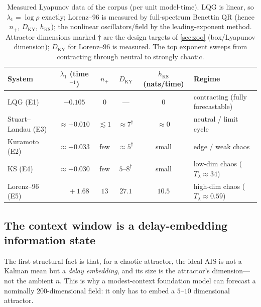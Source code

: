 \documentclass[10pt]{article}
\theoremstyle{plain}
\theoremstyle{definition}
\theoremstyle{remark}
\newcommand{\hKS}{h_{\mathrm{KS}}}
\newcommand{\DKY}{D_{\mathrm{KY}}}
\begin{document}
\begin{table}[t]
\centering\small
\setlength{\tabcolsep}{6pt}\renewcommand{\arraystretch}{1.2}
\caption{Measured Lyapunov data of the corpus (per unit model-time). LQG is
linear, so $\lambda_1=\log\rho$ exactly; Lorenz--96 is measured by full-spectrum
Benettin QR (hence $n_+$, $\DKY$, $\hKS$); the nonlinear oscillators/field by the
leading-exponent method. Attractor dimensions marked $\dagger$ are the design
targets of \cref{sec:zoo} (box/Lyapunov dimension); $D_{\mathrm{KY}}$ for
Lorenz--96 is measured. The top exponent sweeps from contracting through neutral
to strongly chaotic.}
\label{tab:master}
\begin{tabular}{@{}lccccl@{}}
\toprule
System & $\lambda_1$ (time$^{-1}$) & $n_+$ & $\DKY$ & $\hKS$ (nats/time) & Regime\\
\midrule
LQG (E1) & $-0.105$ & $0$ & --- & $0$ & contracting (fully forecastable)\\
Stuart--Landau (E3) & $\approx +0.010$ & $\lesssim1$ & $\approx7^{\dagger}$ & $\approx0$ & neutral / limit cycle\\
Kuramoto (E2) & $\approx +0.033$ & few & $\approx5^{\dagger}$ & small & edge / weak chaos\\
KS (E4) & $\approx +0.030$ & few & $5\text{--}8^{\dagger}$ & small & low-dim chaos ($T_\lambda\!\approx\!34$)\\
Lorenz--96 (E5) & $\phantom{+}{+}1.68$ & $13$ & $27.1$ & $10.5$ & high-dim chaos ($T_\lambda\!\approx\!0.59$)\\
\bottomrule
\end{tabular}
\end{table}

\subsection{The context window is a delay-embedding information state}
The first structural fact is that, for a chaotic attractor, the ideal AIS is not
a Kalman mean but a \emph{delay embedding}, and its size is the attractor's
dimension---not the ambient $n$. This is why a modest-context foundation model can
forecast a nominally $200$-dimensional field: it only has to embed a $5$--$10$
dimensional attractor.
\end{document}
